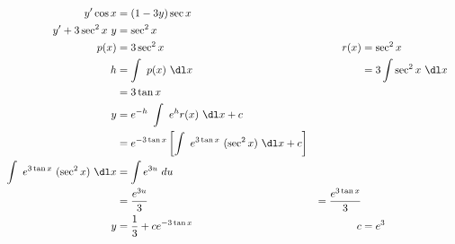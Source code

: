 \begin{enumerate}
          \begin{align}
              y'\cos x                                & =  (1 - 3y)\sec x                                                                                                               \\
              y' + 3\sec^{2} x\ y                     & = \sec^{2}x                                                                                                                     \\
              p(x)                                    & = 3\sec^{2} x                                                             & r(x)                    & = \sec^{2} x              \\
              h                                       & = \int\ p(x)\ \dl x                                                       &                         & = 3\int \sec^{2} x\ \dl x \\
                                                      & = 3 \tan x                                                                                                                      \\
              y                                       & = e^{-h}\ \int\ e^{h}r(x)\ \dl x + c                                                                                            \\
                                                      & = e^{-3\tan x} \left[ \int\ e^{3\tan x}\ (\sec ^{2} x)\ \dl x + c \right]                                                       \\
              \int\ e^{3\tan x}\ (\sec ^{2} x)\ \dl x & = \int e^{3u}\ du                                                                                                               \\
                                                      & =\frac{e^{3u}}{3}                                                         & = \frac{e^{3\tan x}}{3}                             \\
              y                                       & = \frac{1}{3} + ce^{-3\tan x}                                             & c                       & = e^{3}
          \end{align}


\end{enumerate}
